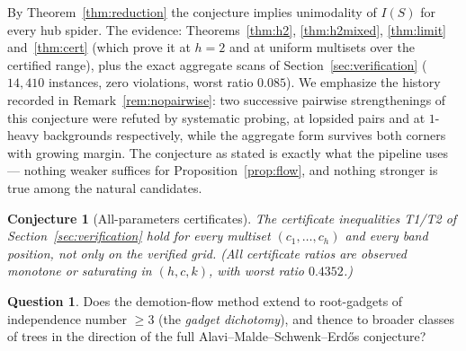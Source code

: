 \documentclass[11pt]{article}
\newtheorem{conjecture}[theorem]{Conjecture}
\theoremstyle{definition}
\newtheorem{question}[theorem]{Question}
\begin{document}
By Theorem~\ref{thm:reduction} the conjecture implies unimodality of
$I(S)$ for every hub spider.  The evidence: Theorems~\ref{thm:h2},
\ref{thm:h2mixed}, \ref{thm:limit} and~\ref{thm:cert} (which prove it
at $h=2$ and at uniform multisets over the certified range), plus the
exact aggregate scans of Section~\ref{sec:verification} ($14{,}410$
instances, zero violations, worst ratio $0.085$).  We emphasize the
history recorded in Remark~\ref{rem:nopairwise}: two successive
pairwise strengthenings of this conjecture were refuted by
systematic probing, at lopsided pairs and at $1$-heavy backgrounds
respectively, while the aggregate form survives both corners with
growing margin.  The conjecture as stated is exactly what the
pipeline uses --- nothing weaker suffices for
Proposition~\ref{prop:flow}, and nothing stronger is true among the
natural candidates.

\begin{conjecture}[All-parameters certificates]\label{conj:g2}
The certificate inequalities T1/T2 of
Section~\ref{sec:verification} hold for every multiset
$(c_1,\dots,c_h)$ and every band position, not only on the verified
grid.  (All certificate ratios are observed monotone or saturating in
$(h,c,k)$, with worst ratio $0.4352$.)
\end{conjecture}

\begin{question}
Does the demotion-flow method extend to root-gadgets of independence
number $\ge3$ (the \emph{gadget dichotomy}), and thence to broader
classes of trees in the direction of the full
Alavi--Malde--Schwenk--Erd\H{o}s conjecture?
\end{question}
\end{document}
